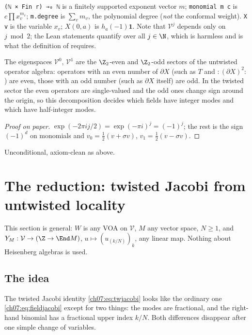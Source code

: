 \begin{dictionary}
\verb|(ℕ × Fin r) →₀ ℕ| is a finitely supported exponent vector $m$; \verb|monomial m c| is
$c\prod x_v^{m_v}$; \verb|m.degree| is $\sum_v m_v$, the polynomial degree (\emph{not} the
conformal weight). \verb|X v| is the variable $x_v$; $X(0,a)$ is $h_a(-1)\mathbf 1$. Note that
$\mathcal V^j$ depends only on $j\bmod 2$; the Lean statements quantify over all $j\in\N$, which
is harmless and is what the definition of  requires.
\end{dictionary}

\begin{physics}
The eigenspaces $\mathcal V^0$, $\mathcal V^1$ are the $\Z_2$-even and $\Z_2$-odd sectors of the untwisted operator algebra: operators with an even number of $\partial X$ (such as $T$ and ${:}(\partial X)^2{:}$) are even, those with an odd number (such as $\partial X$ itself) are odd. In the twisted sector the even operators are single-valued and the odd ones change sign around the origin, so this decomposition decides which fields have integer modes and which have half-integer modes.
\end{physics}

\begin{proof}[Proof on paper]
$\exp(-2\pi i j/2) = \exp(-\pi i)^j = (-1)^j$; the rest is the sign $(-1)^d$ on monomials and
$v_0 = \frac12(v+\sigma v)$, $v_1 = \frac12(v-\sigma v)$.
\end{proof}

\begin{status}
Unconditional, axiom-clean as above.
\end{status}

\section{The reduction: twisted Jacobi from untwisted locality}\label{ch07:sec:reduction}

This section is general: $W$ is any VOA on $\mathcal V$, $M$ any vector space, $N\ge1$, and
$Y_M : \mathcal V\to(\Z\to\End M)$, $u\mapsto(u_{(k/N)})_k$, any linear map. Nothing about
Heisenberg algebras is used.

\subsection{The idea}\label{ch07:sec:redidea}

The twisted Jacobi identity \eqref{ch07:eq:twjacobi} looks like the ordinary one
\eqref{ch07:eq:fieldjacobi} except for two things: the modes are fractional, and the right-hand
binomial has a fractional upper index $k/N$. Both differences disappear after one simple change
of variables.


